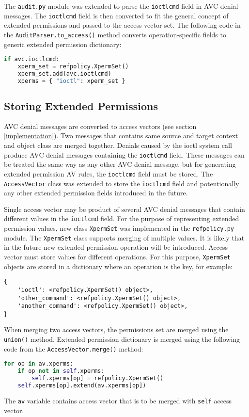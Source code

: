 The \texttt{audit.py} module was extended to parse the \texttt{ioctlcmd} field
in AVC denial messages. The \texttt{ioctlcmd} field is then converted to fit the
general concept of extended permissions and passed to the access vector set. The
following code in the \texttt{AuditParser.to\_access()} method converts
operation-specific fields to generic extended permission dictionary:
\begin{lstlisting}[language=Python]
if avc.ioctlcmd:
    xperm_set = refpolicy.XpermSet()
    xperm_set.add(avc.ioctlcmd)
    xperms = { "ioctl": xperm_set }
\end{lstlisting}

\subsection{Storing Extended Permissions}
AVC denial messages are converted to access vectors (see section
\ref{implementation}). Two messages that contains same source and target context
and object class are merged together. Denials caused by the ioctl system call
produce AVC denial messages containing the \texttt{ioctlcmd} field. These
messages can be treated the same way as any other AVC denial message, but for
generating extended permission AV rules, the \texttt{ioctlcmd} field must be
stored. The \texttt{AccessVector} class was extended to store the
\texttt{ioctlcmd} field and potentionally any other extended permission fields
introduced in the future.

Single access vector may be product of several AVC denial messages that contain
different values in the \texttt{ioctlcmd} field. For the purpose of representing
extended permission values, new class \texttt{XpermSet} was implemented in the
\texttt{refpolicy.py} module. The \texttt{XpermSet} class supports merging of
multiple values. It is likely that in the future new extended permission
operation will be introduced. Access vector must store values for different
operations. For this purpose, \texttt{XpermSet} objects are stored in a
dictionary where an operation is the key, for example:
\begin{lstlisting}
{
    'ioctl': <refpolicy.XpermSet() object>,
    'other_command': <refpolicy.XpermSet() object>,
    'another_command': <refpolicy.XpermSet() object>,
}
\end{lstlisting}

When merging two access vectors, the permissions set are merged using the
\texttt{union()} method. Extended permission dictionary is merged using the
following code from the \texttt{AccessVector.merge()} method:
\begin{lstlisting}[language=Python]
for op in av.xperms:
    if op not in self.xperms:
        self.xperms[op] = refpolicy.XpermSet()
    self.xperms[op].extend(av.xperms[op])
\end{lstlisting}
The \texttt{av} variable contains access vector that is to be merged with
\texttt{self} access vector.

